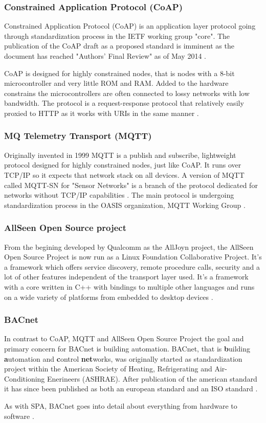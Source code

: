 \subsubsection{Constrained Application Protocol (CoAP)}
Constrained Application Protocol (CoAP) is an application layer protocol
going through standardization process in the IETF working group "core". The
publication of the CoAP draft as a proposed standard is imminent as the
document has reached "Authors' Final Review" as of May 2014 \cite{web:wgcore}.

CoAP is designed for highly constrained nodes, that is nodes with a 8-bit
microcontroller and very little ROM and RAM. Added to the hardware constrains
the microcontrollers are often connected to lossy networks with low bandwidth.
The protocol is a request-response protocol that relatively easily proxied to
HTTP as it works with URIs in the same manner \cite{web:draftcoap}.

\subsubsection{MQ Telemetry Transport (MQTT)}
Originally invented in 1999 MQTT is a publish and subscribe, lightweight
protocol designed for highly constrained nodes, just like CoAP. It runs
over TCP/IP so it expects that network stack on all devices. A version of MQTT
called MQTT-SN for "Sensor Networks" is a branch of the protocol dedicated for
networks without TCP/IP capabilities \cite{web:mqtt,web:mqtt-sn}. The main
protocol is undergoing standardization process in the OASIS organization, MQTT
Working Group \cite{web:oasis-mqtt}.

\subsubsection{AllSeen Open Source project}
From the begining developed by Qualcomm as the AllJoyn project, the AllSeen
Open Source Project is now run as a Linux Foundation Collaborative Project.
It's a framework which offers service discovery, remote procedure calls,
security and a lot of other features independent of the transport layer used.
It's a framework with a core written in C++ with bindings to multiple other
languages and runs on a wide variety of platforms from embedded to desktop
devices \cite{web:alljoyn,web:allseen}.

\subsubsection{BACnet}
In contrast to CoAP, MQTT and AllSeen Open Source Project the goal and primary
concern for BACnet is building automation. BACnet, that is \textbf{b}uilding
\textbf{a}utomation and \textbf{c}ontrol \textbf{net}works, was originally
started as standardization project within the American Society of Heating,
Refrigerating and Air-Conditioning Enerineers (ASHRAE). After publication of
the american standard it has since been published as both an european standard
and an ISO standard \cite{web:bacnet}.

As with SPA, BACnet goes into detail about everything from hardware to
software \cite{web:bacnet-slide15}.
